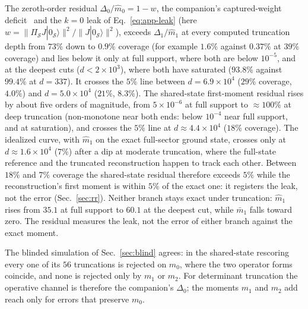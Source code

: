 \documentclass[submission, PhysCore]{SciPost}
\begin{document}
The zeroth-order residual $\Delta_0/\widehat m_0=1-w$, the companion's captured-weight deficit~\cite{SQDspec2608} and the $k=0$ leak of Eq.~\eqref{eq:app-leak} (here $w={\|\Pi_\mathcal{S}J|0_\mathcal{S}\rangle\|^2/\|J|0_\mathcal{S}\rangle\|^2}$), exceeds $\Delta_1/\widehat m_1$ at every computed truncation depth from $73\%$ down to $0.9\%$ coverage (for example $1.6\%$ against $0.37\%$ at $39\%$ coverage) and lies below it only at full support, where both are below $10^{-5}$, and at the deepest cuts ($d<2\times10^3$), where both have saturated ($93.8\%$ against $99.4\%$ at $d=337$). It crosses the $5\%$ line between $d=6.9\times10^4$ ($29\%$ coverage, $4.0\%$) and $d=5.0\times10^4$ ($21\%$, $8.3\%$). The shared-state first-moment residual rises by about five orders of magnitude, from $5\times10^{-6}$ at full support to ${\approx}100\%$ at deep truncation (non-monotone near both ends: below $10^{-4}$ near full support, and at saturation), and crosses the $5\%$ line at $d\approx4.4\times10^{4}$ ($18\%$ coverage). The idealized curve, with $\widehat m_1$ on the exact full-sector ground state, crosses only at $d\approx1.6\times10^{4}$ ($7\%$) after a dip at moderate truncation, where the full-state reference and the truncated reconstruction happen to track each other. Between $18\%$ and $7\%$ coverage the shared-state residual therefore exceeds $5\%$ while the reconstruction's first moment is within $5\%$ of the exact one: it registers the leak, not the error (Sec.~\ref{sec:rr}). Neither branch stays exact under truncation: $\widehat m_1$ rises from $35.1$ at full support to $60.1$ at the deepest cut, while $\bar m_1$ falls toward zero. The residual measures the leak, not the error of either branch against the exact moment.

The blinded simulation of Sec.~\ref{sec:blind} agrees: in the shared-state rescoring every one of its $56$ truncations is rejected on $m_0$, where the two operator forms coincide, and none is rejected only by $m_1$ or $m_2$. For determinant truncation the operative channel is therefore the companion's $\Delta_0$; the moments $m_1$ and $m_2$ add reach only for errors that preserve $m_0$.
\end{document}
